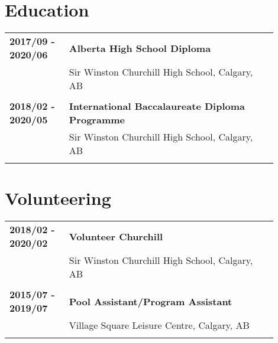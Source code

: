 \documentclass[letterpaper]{article}
\begin{document}
    \section*{Education}
        \begin{tabular}{p{0.2\linewidth}p{0.7\linewidth}} 
            \textbf{2017/09 - 2020/06} & \large\textbf{Alberta High School Diploma} \\
            & Sir Winston Churchill High School, Calgary, AB \\
            \\
            \textbf{2018/02 - 2020/05} & \large\textbf{International Baccalaureate Diploma Programme} \\
            & Sir Winston Churchill High School, Calgary, AB \\
            \\
        \end{tabular}

    \section*{Volunteering}
        \begin{tabular}{p{0.2\linewidth}p{0.7\linewidth}} 
            \textbf{2018/02 - 2020/02} & \large\textbf{Volunteer Churchill} \\
            & Sir Winston Churchill High School, Calgary, AB \\
            \\
            \textbf{2015/07 - 2019/07} & \large\textbf{Pool Assistant/Program Assistant} \\
            & Village Square Leisure Centre, Calgary, AB \\
            \\
        \end{tabular}
\end{document}
